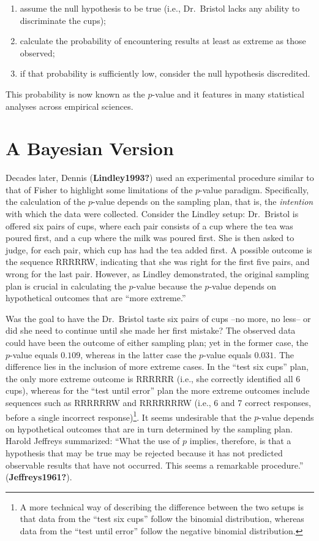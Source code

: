 \documentclass[
  letterpaper,
  DIV=11,
  numbers=noendperiod]{scrreprt}
\providecommand{\tightlist}{%
  \setlength{\itemsep}{0pt}\setlength{\parskip}{0pt}}\usepackage{longtable,booktabs,array}
\begin{document}
\begin{enumerate}
\def\labelenumi{\arabic{enumi}.}
\tightlist
\item
  assume the null hypothesis to be true (i.e., Dr.~Bristol lacks any
  ability to discriminate the cups);
\item
  calculate the probability of encountering results at least as extreme
  as those observed;
\item
  if that probability is sufficiently low, consider the null hypothesis
  discredited.
\end{enumerate}

This probability is now known as the \(p\)-value and it features in many
statistical analyses across empirical sciences.

\hypertarget{a-bayesian-version}{%
\section{A Bayesian Version}\label{a-bayesian-version}}

Decades later, Dennis (\textbf{Lindley1993?}) used an experimental
procedure similar to that of Fisher to highlight some limitations of the
\(p\)-value paradigm. Specifically, the calculation of the \(p\)-value
depends on the sampling plan, that is, the \textit{intention} with which
the data were collected. Consider the Lindley setup: Dr.~Bristol is
offered six pairs of cups, where each pair consists of a cup where the
tea was poured first, and a cup where the milk was poured first. She is
then asked to judge, for each pair, which cup has had the tea added
first. A possible outcome is the sequence RRRRRW, indicating that she
was right for the first five pairs, and wrong for the last pair.
However, as Lindley demonstrated, the original sampling plan is crucial
in calculating the \(p\)-value because the \(p\)-value depends on
hypothetical outcomes that are ``more extreme.''

Was the goal to have the Dr.~Bristol taste six pairs of cups --no more,
no less-- or did she need to continue until she made her first mistake?
The observed data could have been the outcome of either sampling plan;
yet in the former case, the \(p\)-value equals \(0.109\), whereas in the
latter case the \(p\)-value equals \(0.031\). The difference lies in the
inclusion of more extreme cases. In the ``test six cups'' plan, the only
more extreme outcome is RRRRRR (i.e., she correctly identified all 6
cups), whereas for the ``test until error'' plan the more extreme
outcomes include sequences such as RRRRRRW and RRRRRRRW (i.e., 6 and 7
correct responses, before a single incorrect response)\footnote{A more
  technical way of describing the difference between the two setups is
  that data from the ``test six cups'' follow the binomial distribution,
  whereas data from the ``test until error'' follow the negative
  binomial distribution.}. It seems undesirable that the \(p\)-value
depends on hypothetical outcomes that are in turn determined by the
sampling plan. Harold Jeffreys summarized: ``What the use of \(p\)
implies, therefore, is that a hypothesis that may be true may be
rejected because it has not predicted observable results that have not
occurred. This seems a remarkable procedure.'' (\textbf{Jeffreys1961?}).
\end{document}
